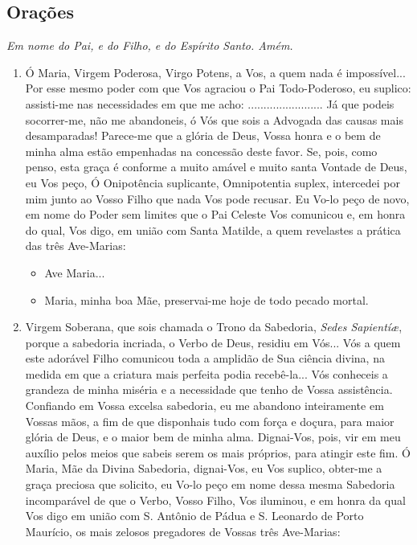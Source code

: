 \documentclass[18pt]{article}
\begin{document}
\begin{justify}

\newpage
\begin{center}
 \section{Orações}\label{sec:Orações} %
\textit{Em nome do Pai, e do Filho, e do Espírito Santo. Amém.}
\end{center}


\begin{enumerate}
 \item  Ó Maria, Virgem Poderosa, Virgo Potens, a Vos, a quem nada é impossível... Por esse mesmo poder com que Vos agraciou o Pai Todo-Poderoso, eu suplico: assisti-me nas necessidades em que me acho: ........................ Já que podeis socorrer-me, não me abandoneis, ó Vós que sois a Advogada das causas mais desamparadas! Parece-me que a glória de Deus, Vossa honra e o bem de minha alma estão empenhadas na concessão deste favor. Se, pois, como penso, esta graça é conforme a muito amável e muito santa Vontade de Deus, eu Vos peço, Ó Onipotência suplicante, Omnipotentia suplex, intercedei por mim junto ao Vosso Filho que nada Vos pode recusar. Eu Vo-lo peço de novo, em nome do Poder sem limites que o Pai Celeste Vos comunicou e, em honra do qual, Vos digo, em união com Santa Matilde, a quem revelastes a prática das três Ave-Marias:


  \begin{itemize}
   \item Ave Maria...
   \item Maria, minha boa Mãe, preservai-me hoje de todo pecado mortal.
  \end{itemize}

 \item Virgem Soberana, que sois chamada o Trono da Sabedoria, \textit{Sedes Sapientí\ae}, porque a sabedoria incriada, o Verbo de Deus, residiu em Vós... Vós a quem este adorável Filho comunicou toda a amplidão de Sua ciência divina, na medida em que a criatura mais perfeita podia recebê-la... Vós conheceis a grandeza de minha miséria e a necessidade que tenho de Vossa assistência. Confiando em Vossa excelsa sabedoria, eu me abandono inteiramente em Vossas mãos, a fim de que disponhais tudo com força e doçura, para maior glória de Deus, e o maior bem de minha alma. Dignai-Vos, pois, vir em meu auxílio pelos meios que sabeis serem os mais próprios, para atingir este fim. Ó Maria, Mãe da Divina Sabedoria, dignai-Vos, eu Vos suplico, obter-me a graça preciosa que solicito, eu Vo-lo peço em nome dessa mesma Sabedoria incomparável de que o Verbo, Vosso Filho, Vos iluminou, e em honra da qual Vos digo em união com S. Antônio de Pádua e S. Leonardo de Porto Maurício, os mais zelosos pregadores de Vossas três Ave-Marias:


\end{enumerate}
\end{justify}
\end{document}
